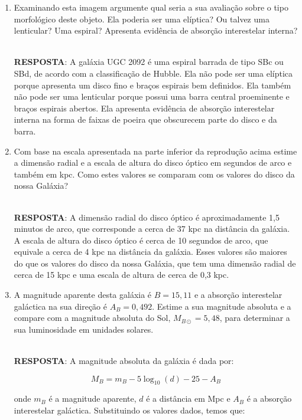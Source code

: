 \documentclass[a4paper,12pt]{article}
\begin{document}
\begin{enumerate}
\begin{enumerate}
\item Examinando esta imagem argumente qual seria a sua avaliação sobre o tipo morfológico deste objeto. Ela poderia ser uma elíptica? Ou talvez uma lenticular? Uma espiral? Apresenta evidência de absorção interestelar interna?

\noindent\hrulefill\\\textbf{RESPOSTA}: A galáxia UGC 2092 é uma espiral barrada de tipo SBc ou SBd, de acordo com a classificação de Hubble. Ela não pode ser uma elíptica porque apresenta um disco fino e braços espirais bem definidos. Ela também não pode ser uma lenticular porque possui uma barra central proeminente e braços espirais abertos. Ela apresenta evidência de absorção interestelar interna na forma de faixas de poeira que obscurecem parte do disco e da barra.

\noindent\hrulefill

\item Com base na escala apresentada na parte inferior da reprodução acima estime a dimensão radial e a escala de altura do disco óptico em segundos de arco e também em kpc. Como estes valores se comparam com os valores do disco da nossa Galáxia?

\noindent\hrulefill\\\textbf{RESPOSTA}: A dimensão radial do disco óptico é aproximadamente 1,5 minutos de arco, que corresponde a cerca de 37 kpc na distância da galáxia. A escala de altura do disco óptico é cerca de 10 segundos de arco, que equivale a cerca de 4 kpc na distância da galáxia. Esses valores são maiores do que os valores do disco da nossa Galáxia, que tem uma dimensão radial de cerca de 15 kpc e uma escala de altura de cerca de 0,3 kpc.

\noindent\hrulefill

\item A magnitude aparente desta galáxia é $B=15,11$ e a absorção interestelar galáctica na sua direção é $A_B=0,492$. Estime a sua magnitude absoluta e a compare com a magnitude absoluta do Sol, $M_{B\odot} =5,48$, para determinar a sua luminosidade em unidades solares.

\noindent\hrulefill\\\textbf{RESPOSTA}: A magnitude absoluta da galáxia é dada por:

$$M_B = m_B - 5 \log_{10} (d) - 25 - A_B$$

onde $m_B$ é a magnitude aparente, $d$ é a distância em Mpc e $A_B$ é a absorção interestelar galáctica. Substituindo os valores dados, temos que:


\end{enumerate}
\end{enumerate}
\end{document}
